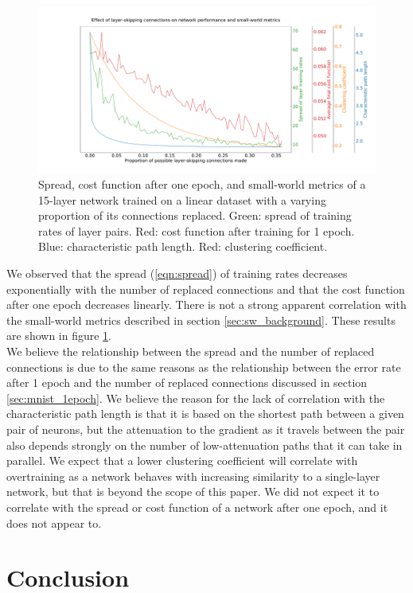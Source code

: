 \documentclass{article}
\newcommand{\npar}{\\\indent}
\begin{document}
\begin{figure}
  \centering
  \includegraphics[width=\textwidth]{figures/Linear_spread_vs_conns.pdf}
  \caption{Spread, cost function after one epoch, and small-world metrics of a 15-layer network trained on a linear dataset with a varying proportion of its connections replaced. Green: spread of training rates of layer pairs. Red: cost function after training for 1 epoch. Blue: characteristic path length. Red: clustering coefficient.}
  \label{fig:linear_spread}
\end{figure}

We observed that the spread (\ref{eqn:spread}) of training rates decreases exponentially with the number of replaced connections and that the cost function after one epoch decreases linearly. There is not a strong apparent correlation with the small-world metrics described in section \ref{sec:sw_background}. These results are shown in figure \ref{fig:linear_spread}.
\npar
We believe the relationship between the spread and the number of replaced connections is due to the same reasons as the relationship between the error rate after 1 epoch and the number of replaced connections discussed in section \ref{sec:mnist_1epoch}. We believe the reason for the lack of correlation with the characteristic path length is that it is based on the shortest path between a given pair of neurons, but the attenuation to the gradient as it travels between the pair also depends strongly on the number of low-attenuation paths that it can take in parallel. We expect that a lower clustering coefficient will correlate with overtraining as a network behaves with increasing similarity to a single-layer network, but that is beyond the scope of this paper. We did not expect it to correlate with the spread or cost function of a network after one epoch, and it does not appear to.


\section{Conclusion}
\end{document}
